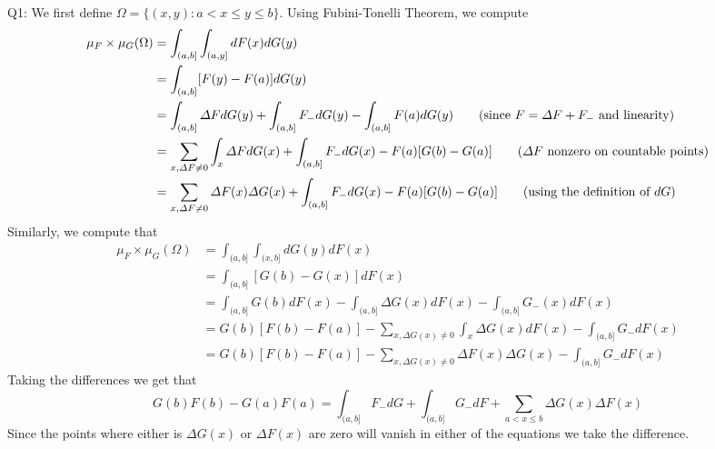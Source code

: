 \documentclass[letterpaper]{article}
\begin{document}
\noindent Q1: We first define $\Omega = \{(x,y): a< x\leq y \leq b\}$. Using Fubini-Tonelli Theorem, we compute 
\begin{align*}
    \mu_F\times \mu_G(\Omega) &= \int_{(a,b]} \int_{(a,y]} dF(x)dG(y)
    \\ & = \int_{(a,b]} [F(y) - F(a)]dG(y)
    \\ & = \int_{(a,b]} \varDelta F dG(y) + \int_{(a,b]} F_{-}dG(y) - \int_{(a,b]} F(a)dG(y) \tag{since $F = \varDelta F + F_{-}$ and linearity}
    \\ & = \sum_{x, \varDelta F\neq 0}\int_{x} \varDelta F dG(x) + \int_{(a,b]} F_{-}dG(x) - F(a)[G(b) - G(a)] \tag{$\varDelta F$ nonzero on countable points}
    \\ & = \sum_{x, \varDelta F \neq 0} \varDelta F(x) \varDelta G(x) + \int_{(a,b]} F_{-}dG(x) - F(a) [ G(b) - G(a)] \tag{using the definition of $dG$}
\end{align*}
Similarly, we compute that 
\begin{align*}
    \mu_F \times \mu_G (\Omega) &= \int_{(a,b]} \int_{(x,b]} dG(y) dF(x)
    \\ & = \int_{(a,b]} [G(b) - G(x)]dF(x) \tag{take decreasing sequence to $(x,b]$, apply downward measure cont.}
    \\ & = \int_{(a,b]} G(b) dF(x) - \int_{(a,b]} \varDelta G(x)dF(x) - \int_{(a,b]} G_{-}(x) dF(x) 
    \\ & = G(b)[F(b)-F(a)] - \sum_{x, \varDelta G(x) \neq 0} \int_{x} \varDelta G(x)dF(x) - \int_{(a,b]} G_{-}dF(x) 
    \\ & = G(b)[F(b) - F(a)] - \sum_{x, \varDelta G(x) \neq 0 } \varDelta F(x) \varDelta G(x) -\int_{(a,b]} G_{-}dF(x)
\end{align*}
Taking the differences we get that $$G(b)F(b)- G(a)F(a) = \int_{(a,b]} F_{-}dG + \int_{(a,b]}G_{-}dF  + \sum_{a< x\leq b} \varDelta G(x) \varDelta F(x)$$
Since the points where either is $\varDelta G(x)$ or $\varDelta F(x)$ are zero will vanish in either of the equations we take the difference. 
\end{document}
